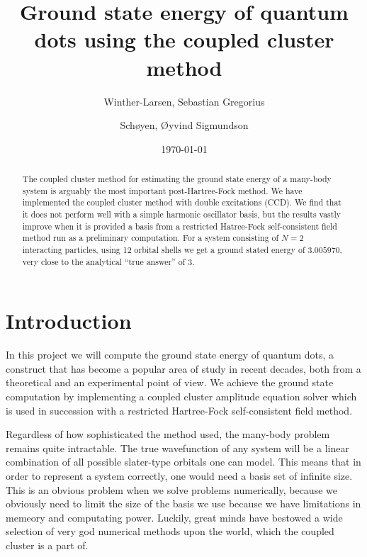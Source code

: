 \documentclass[
    a4paper, aps, twocolumn, floatfix, superscriptaddress,
    nofootinbib]{revtex4-1}
\newcommand{\1}{\mathds{1}}
\begin{document}
\title{Ground state energy of quantum dots using the coupled cluster method}
\author{Winther-Larsen, Sebastian Gregorius}
\author{Schøyen, Øyvind Sigmundson}
\date{\today}

\begin{abstract}
    The coupled cluster method for estimating the ground state energy of a
    many-body system is arguably the most important post-Hartree-Fock method. We
    have implemented the coupled cluster method with double excitations (CCD).
    We find that it does not perform well with a simple harmonic oscillator
    basis, but the results vastly improve when it is provided a basis from a
    restricted Hatree-Fock self-consistent field method run as a preliminary
    computation. For a system consisting of $N=2$ interacting particles, using
    12 orbital shells we get a ground stated energy of $3.005970$, very close to
    the analytical ``true answer'' of $3$\cite{taut1994two}.
\end{abstract}

\maketitle
\tableofcontents


\section{Introduction}
    In this project we will compute the ground state energy of quantum dots, a
    construct that has become a popular area of study in recent decades, both
    from a theoretical and an experimental point of view. We achieve the ground
    state computation by implementing a coupled cluster amplitude equation
    solver which is used in succession with a restricted Hartree-Fock
    self-consistent field method.

    Regardless of how sophisticated the method used, the many-body problem
    remains quite intractable. The true wavefunction of any system will be a
    linear combination of all possible slater-type orbitals one can model. This
    means that in order to represent a system correctly, one would need a basis
    set of infinite size. This is an obvious problem when we solve problems
    numerically, because we obviously need to limit the size of the basis we use
    because we have limitations in memeory and computating power. Luckily, great
    minds have bestowed a wide selection of very god numerical methods upon the
    world, which the coupled cluster is a part of.
\end{document}
